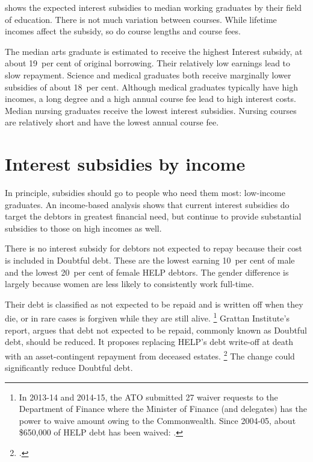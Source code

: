 \documentclass[embargoed]{grattan}
\begin{document}
 shows the expected interest subsidies to median working graduates by their field of education. There is not much variation between courses. While lifetime incomes affect the subsidy, so do course lengths and course fees.



The median arts graduate is estimated to receive the highest \gls{Interest subsidy}, at about 19~per cent of original borrowing.
Their relatively low earnings lead to slow repayment.
Science and medical graduates both receive marginally lower subsidies of about 18~per cent.
Although medical graduates typically have high incomes, a long degree and a high annual course fee lead to high interest costs.
Median nursing graduates receive the lowest interest subsidies.
Nursing courses are relatively short and have the lowest annual course fee.

\section{Interest subsidies by income}\label{sec:interest-subsidies-by-income}

In principle, subsidies should go to people who need them most: low-income graduates.
An income-based analysis shows that current interest subsidies do target the debtors in greatest financial need, but continue to provide substantial subsidies to those on high incomes as well.

There is no interest subsidy for debtors not expected to repay because their cost is included in \gls{Doubtful debt}.
These are the lowest earning 10~per cent of male and the lowest 20~per cent of female \gls{HELP} debtors.
The gender difference is largely because women are less likely to consistently work full-time.

Their debt is classified as not expected to be repaid and is written off when they die, or in rare cases is forgiven while they are still alive.%
\footnote{In 2013-14 and 2014-15, the \gls{ATO} submitted 27 waiver requests to the Department of Finance where the Minister of Finance (and delegates) has the power to waive amount owing to the Commonwealth.
Since 2004-05, about \$650,000 of \gls{HELP} debt has been waived: \textcite[][38]{ANAO2016AdministrationHigherEducation}.} Grattan Institute's \citeyear{Norton2014Doubtfuldebtrising} report,  argues that debt not expected to be repaid, commonly known as \gls{Doubtful debt}, should be reduced.
It proposes replacing \gls{HELP}'s debt write-off at death with an asset-contingent repayment from deceased estates.%
\footcite{Norton2014Doubtfuldebtrising} 
The change could significantly reduce \gls{Doubtful debt}.
\end{document}
